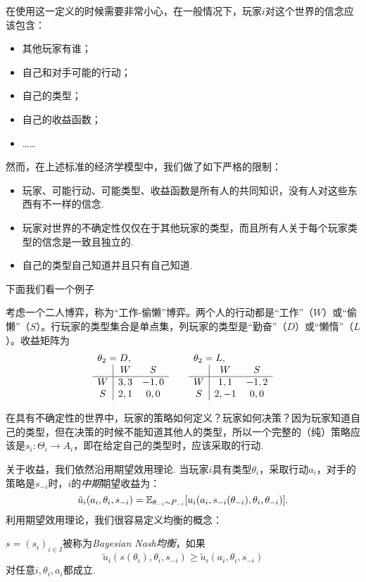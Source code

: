 在使用这一定义的时候需要非常小心，在一般情况下，玩家$i$对这个世界的信念应该包含：
\begin{itemize}
    \item 其他玩家有谁；
    \item 自己和对手可能的行动；
    \item 自己的类型；
    \item 自己的收益函数；
    \item ……
\end{itemize}
然而，在上述标准的经济学模型中，我们做了如下严格的限制：
\begin{itemize}
    \item 玩家、可能行动、可能类型、收益函数是所有人的共同知识，没有人对这些东西有不一样的信念. 
    \item 玩家对世界的不确定性仅仅在于其他玩家的类型，而且所有人关于每个玩家类型的信念是一致且独立的.
    \item 自己的类型自己知道并且只有自己知道.
\end{itemize} 

下面我们看一个例子


\begin{example}[合作者]
考虑一个二人博弈，称为“工作-偷懒”博弈。两个人的行动都是“工作”（$W$）或“偷懒”（$S$）。行玩家的类型集合是单点集，列玩家的类型是“勤奋”（$D$）或“懒惰”（$L$）。收益矩阵为
\[\begin{array}{c|cc}
    \multicolumn{3}{l}{\theta_2=D,}\\
     &W&S  \\\hline
     W&3,3&-1,0\\
     S&2,1&0,0\\
\end{array}\qquad \begin{array}{c|cc}
    \multicolumn{3}{l}{\theta_2=L,}\\
     &W&S  \\\hline
     W&1,1&-1,2\\
     S&2,-1&0,0\\
\end{array}\]
\end{example}

在具有不确定性的世界中，玩家的策略如何定义？玩家如何决策？因为玩家知道自己的类型，但在决策的时候不能知道其他人的类型，所以一个完整的（纯）策略应该是$s_i:\Theta_i\to A_i$，即在给定自己的类型时，应该采取的行动.

关于收益，我们依然沿用期望效用理论. 当玩家$i$具有类型$\theta_i$，采取行动$a_i$，对手的策略是$s_{-i}$时，$i$的\emph{中期}期望收益为：
    \[\tilde u_i(a_i,\theta_i,s_{-i})=\mathbb{E}_{\theta_{-i}\sim P_{-i}}[u_i(a_i,s_{-i}(\theta_{-i}),\theta_i,\theta_{-i})].\]
利用期望效用理论，我们很容易定义均衡的概念：
\begin{definition}
$s=(s_i)_{i\in I}$被称为\emph{Bayesian Nash均衡}，如果
    \[\tilde u_i(s(\theta_i),\theta_i,s_{-i})\geq \tilde u_i(a_i,\theta_i,s_{-i})\]
对任意$i,\theta_i,a_i$都成立.
\end{definition}

